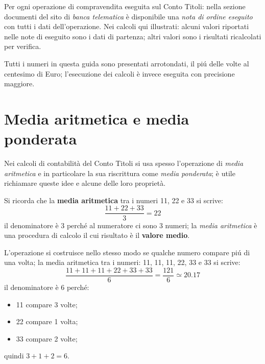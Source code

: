 \documentclass[12pt,a4paper]{article}
\begin{document}
Per ogni operazione di compravendita eseguita sul  Conto Titoli: nella sezione documenti del sito di
\emph{banca  telematica}  è  disponibile  una  \emph{nota  di ordine  eseguito}  con  tutti  i  dati
dell'operazione.  Nei calcoli qui illustrati: alcuni valori  riportati nelle note di eseguito sono i
dati di partenza; altri valori sono i risultati ricalcolati per verifica.

Tutti i numeri in questa guida sono presentati arrotondati, il piú delle volte al centesimo di Euro;
l'esecuzione dei calcoli è invece eseguita con precisione maggiore.

\section{Media aritmetica e media ponderata}


Nei calcoli di contabilità del Conto Titoli  si usa spesso l'operazione di \emph{media aritmetica} e
in particolare  la sua  riscrittura come \emph{media  ponderata}; è utile  richiamare queste  idee e
alcune delle loro proprietà.

Si ricorda che la \textbf{media aritmetica} tra i numeri \num{11}, \num{22} e \num{33} si scrive:
\begin{equation*}
  \frac{\num{11} + \num{22} + \num{33}}{3} = \num{22}
\end{equation*}
il denominatore è \num{3} perché al numeratore  ci sono \num{3} numeri; la \emph{media aritmetica} è
una procedura di calcolo il cui risultato è il \textbf{valore medio}.

L'operazione si costruisce  nello stesso modo se qualche  numero compare piú di una  volta; la media
aritmetica tra i numeri: \num{11}, \num{11}, \num{11}, \num{22}, \num{33} e \num{33} si scrive:
\begin{equation*}
  \frac{\num{11} + \num{11} + \num{11} + \num{22} + \num{33} + \num{33}}{6}
  = \frac{121}{6} \simeq \num{20,17}
\end{equation*}
il denominatore è \num{6} perché:
\begin{itemize}
\item \num{11} compare \num{3} volte;
\item \num{22} compare \num{1} volta;
\item \num{33} compare \num{2} volte;
\end{itemize}
quindi \(\num{3} + \num{1} + \num{2} = \num{6}\).
\end{document}
